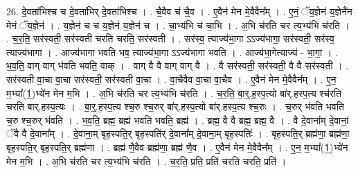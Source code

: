 \documentclass[17pt]{extarticle}
\begin{document}
26. दे॒वता॑भिश्च च दे॒वता॑भिर् दे॒वता॑भिश्च । . चै॒वैव च॑ चै॒व । . ए॒वैन॑ मेन मे॒वैवैन᳚म् । . ए॒नं॒ ॅय॒ज्ञेन॑ य॒ज्ञेनै॑न मेनं ॅय॒ज्ञेन॑ । . य॒ज्ञेन॑ च च य॒ज्ञेन॑ य॒ज्ञेन॑ च । . चा॒भ्य॑भि च॑ चा॒भि । . अ॒भि च॑रति चर त्य॒भ्य॑भि च॑रति । . च॒र॒ति॒ सर॑स्वती॒ सर॑स्वती चरति चरति॒ सर॑स्वती । . सर॑स्व॒ त्याज्य॑भा॒गा ऽऽज्य॑भागा॒ सर॑स्वती॒ सर॑स्व॒ त्याज्य॑भागा । . आज्य॑भागा भवति भव॒ त्याज्य॑भा॒गा ऽऽज्य॑भागा भवति । . आज्य॑भा॒गेत्याज्य॑ - भा॒गा॒ । . भ॒व॒ति॒ वाग् वाग् भ॑वति भवति॒ वाक् । . वाग् वै वै वाग् वाग् वै । . वै सर॑स्वती॒ सर॑स्वती॒ वै वै सर॑स्वती । . सर॑स्वती वा॒चा वा॒चा सर॑स्वती॒ सर॑स्वती वा॒चा । . वा॒चैवैव वा॒चा वा॒चैव । . ए॒वैन॑ मेन मे॒वैवैन᳚म् । . ए॒न॒ म॒भ्या᳚(1॒)भ्ये॑न मेन म॒भि । . अ॒भि च॑रति चर त्य॒भ्य॑भि च॑रति । . च॒र॒ति॒ बा॒र्॒.ह॒स्प॒त्यो बा॑र्.हस्प॒त्य श्च॑रति चरति बार्.हस्प॒त्यः । . बा॒र्॒.ह॒स्प॒त्य श्च॒रु श्च॒रुर् बा॑र्.हस्प॒त्यो बा॑र्.हस्प॒त्य श्च॒रुः । . च॒रुर् भ॑वति भवति च॒रु श्च॒रुर् भ॑वति । . भ॒व॒ति॒ ब्रह्म॒ ब्रह्म॑ भवति भवति॒ ब्रह्म॑ । . ब्रह्म॒ वै वै ब्रह्म॒ ब्रह्म॒ वै । . वै दे॒वाना᳚म् दे॒वानां॒ ॅवै वै दे॒वाना᳚म् । . दे॒वाना॒म् बृह॒स्पति॒र् बृह॒स्पति॑र् दे॒वाना᳚म् दे॒वाना॒म् बृह॒स्पतिः॑ । . बृह॒स्पति॒र् ब्रह्म॑णा॒ ब्रह्म॑णा॒ बृह॒स्पति॒र् बृह॒स्पति॒र् ब्रह्म॑णा । . ब्रह्म॑ णै॒वैव ब्रह्म॑णा॒ ब्रह्म॑ णै॒व । . ए॒वैन॑ मेन मे॒वैवैन᳚म् । . ए॒न॒ म॒भ्या᳚(1॒)भ्ये॑न मेन म॒भि । . अ॒भि च॑रति चर त्य॒भ्य॑भि च॑रति । . च॒र॒ति॒ प्रति॒ प्रति॑ चरति चरति॒ प्रति॑ । \newline
\end{document}
